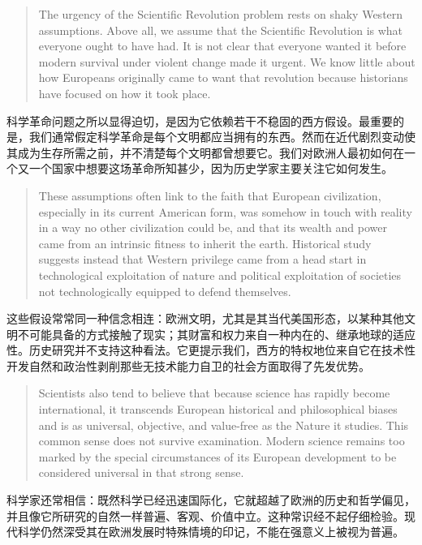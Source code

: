 \documentclass[UTF8,zihao=-4]{ctexart}
\newenvironment{enblock}
  {\par\smallskip\noindent{\scriptsize\bfseries English}\par\begin{quote}\small}
  {\end{quote}}
\newenvironment{zhblock}
  {\par\noindent{\scriptsize\bfseries 中文}\par}
  {\par\medskip}
\begin{document}
\begin{enblock}
The urgency of the Scientific Revolution problem rests on shaky Western assumptions. Above all, we assume that the Scientific Revolution is what everyone ought to have had. It is not clear that everyone wanted it before modern survival under violent change made it urgent. We know little about how Europeans originally came to want that revolution because historians have focused on how it took place.
\end{enblock}
\begin{zhblock}
科学革命问题之所以显得迫切，是因为它依赖若干不稳固的西方假设。最重要的是，我们通常假定科学革命是每个文明都应当拥有的东西。然而在近代剧烈变动使其成为生存所需之前，并不清楚每个文明都曾想要它。我们对欧洲人最初如何在一个又一个国家中想要这场革命所知甚少，因为历史学家主要关注它如何发生。
\end{zhblock}

\begin{enblock}
These assumptions often link to the faith that European civilization, especially in its current American form, was somehow in touch with reality in a way no other civilization could be, and that its wealth and power came from an intrinsic fitness to inherit the earth. Historical study suggests instead that Western privilege came from a head start in technological exploitation of nature and political exploitation of societies not technologically equipped to defend themselves.
\end{enblock}
\begin{zhblock}
这些假设常常同一种信念相连：欧洲文明，尤其是其当代美国形态，以某种其他文明不可能具备的方式接触了现实；其财富和权力来自一种内在的、继承地球的适应性。历史研究并不支持这种看法。它更提示我们，西方的特权地位来自它在技术性开发自然和政治性剥削那些无技术能力自卫的社会方面取得了先发优势。
\end{zhblock}

\begin{enblock}
Scientists also tend to believe that because science has rapidly become international, it transcends European historical and philosophical biases and is as universal, objective, and value-free as the Nature it studies. This common sense does not survive examination. Modern science remains too marked by the special circumstances of its European development to be considered universal in that strong sense.
\end{enblock}
\begin{zhblock}
科学家还常相信：既然科学已经迅速国际化，它就超越了欧洲的历史和哲学偏见，并且像它所研究的自然一样普遍、客观、价值中立。这种常识经不起仔细检验。现代科学仍然深受其在欧洲发展时特殊情境的印记，不能在强意义上被视为普遍。
\end{zhblock}
\end{document}
